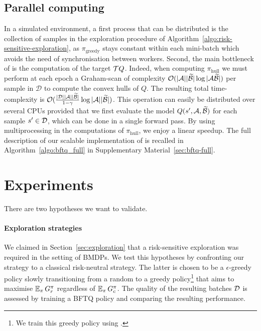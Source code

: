 \documentclass{article}
\begin{document}
\subsection{Parallel computing}

In a simulated environment, a first process that can be distributed is the collection of samples in the exploration procedure of Algorithm~\ref{algo:risk-sensitive-exploration}, as $\pi_\text{greedy}$ stays constant within each mini-batch which avoids the need of synchronisation between workers. Second, the main bottleneck of \BFTQ is the computation of the target $\mathcal{T} Q$. Indeed, when computing $\pi_\text{hull}$ we must perform at each epoch a Graham-scan of complexity $\mathcal{O}(|\mathcal{A}||\widetilde{\mathcal{B}}| \log |\mathcal{A}\widetilde{\mathcal{B}}|)$ per sample in $\mathcal{D}$ to compute the convex hulls of $Q$. The resulting total time-complexity is $\mathcal{O}(\frac{|\mathcal{D}||\mathcal{A}||\widetilde{\mathcal{B}}|}{1-\gamma} \log |\mathcal{A}||\widetilde{\mathcal{B}}|)$. This operation can easily be distributed over several CPUs provided that we first evaluate the model $Q(s',\mathcal{A},\widetilde{\mathcal{B}})$ for each sample $s'\in\mathcal{D}$, which can be done in a single forward pass. By using multiprocessing in the computations of $\pi_\text{hull}$, we enjoy a linear speedup.%
The full description of our scalable implementation of \BFTQ is recalled in Algorithm~\ref{algo:bftq_full} in Supplementary Material~\ref{sec:bftq-full}.

\section{Experiments}

There are two hypotheses we want to validate.

\paragraph{Exploration strategies} We claimed in Section~\ref{sec:exploration} that a risk-sensitive exploration was required in the setting of BMDPs. We test this hypotheses by confronting our strategy to a classical risk-neutral strategy. The latter is chosen to be a $\epsilon$-greedy policy slowly transitioning from a random to a greedy policy\footnote{We train this greedy policy using \FTQ.} that aims to maximise $\operatorname*{\mathbb{E}}_{\pi} G_r^\pi$ regardless of $\operatorname*{\mathbb{E}}_{\pi} G_c^\pi$. The quality of the resulting batches $\mathcal{D}$ is assessed by training a BFTQ policy and comparing the resulting performance.
\end{document}
